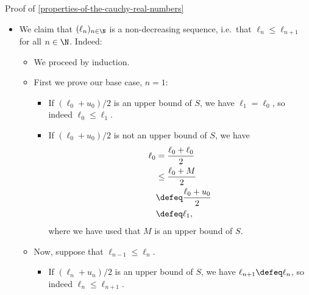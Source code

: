 \begin{Proof}{Proof of \cref{properties-of-the-cauchy-real-numbers}}
\begin{itemize}
\begin{itemize}
\begin{itemize}
                            \begin{align*}
                                \ell_{n+1} &=      \frac{\ell_{n}+u_{n}}{2}\\
                                           &\leq   \frac{u_{n}+u_{n}}{2}\\
                                           &=      u_{n}\\
                                           &\defeq u_{n+1}.
                            \end{align*}
                    \end{itemize}
            \end{itemize}
        \item We claim that $(\ell_{n})_{n\in\N}$ is a non-decreasing sequence, i.e.\ that $\ell_{n}\leq\ell_{n+1}$ for all $n\in\N$. Indeed:
            \begin{itemize}
                \item We proceed by induction.
                \item First we prove our base case, $n=1$:
                    \begin{itemize}
                        \item If $(\ell_{0}+u_{0})/2$ is an upper bound of $S$, we have $\ell_{1}=\ell_{0}$, so indeed $\ell_{0}\leq\ell_{1}$.
                        \item If $(\ell_{0}+u_{0})/2$ is not an upper bound of $S$, we have
                            \begin{align*}
                                \ell_{0} &=      \frac{\ell_{0}+\ell_{0}}{2}\\
                                         &\leq   \frac{\ell_{0}+M}{2}\\
                                         &\defeq \frac{\ell_{0}+u_{0}}{2}\\
                                         &\defeq \ell_{1},
                            \end{align*}
                            where we have used that $M$ is an upper bound of $S$.
                    \end{itemize}
                \item Now, suppose that $\ell_{n-1}\leq\ell_{n}$.
                    \begin{itemize}
                        \item If $(\ell_{n}+u_{n})/2$ is an upper bound of $S$, we have $\ell_{n+1}\defeq\ell_{n}$, so indeed $\ell_{n}\leq\ell_{n+1}$.

\end{itemize}
\end{itemize}
\end{itemize}
\end{Proof}
